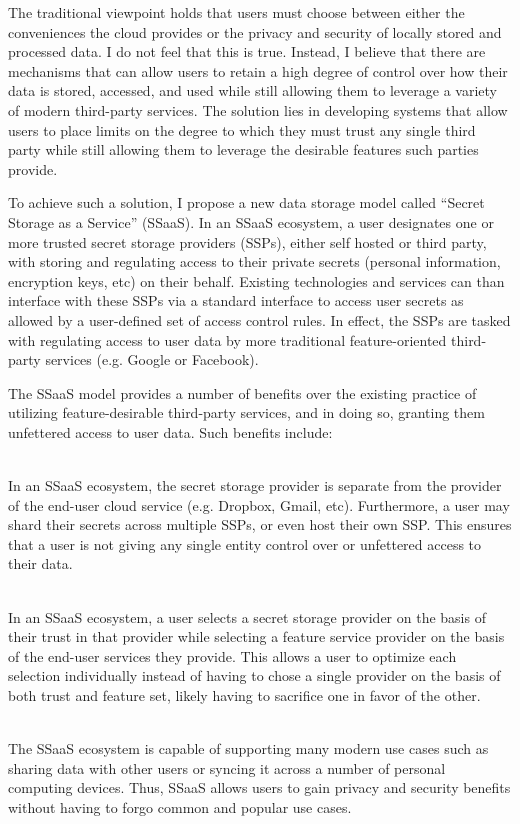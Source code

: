 The traditional viewpoint holds that users must choose between either
the conveniences the cloud provides or the privacy and security of
locally stored and processed data. I do not feel that this is
true. Instead, I believe that there are mechanisms that can allow
users to retain a high degree of control over how their data is
stored, accessed, and used while still allowing them to leverage a
variety of modern third-party services. The solution lies in
developing systems that allow users to place limits on the degree to
which they must trust any single third party while still allowing them
to leverage the desirable features such parties provide.

To achieve such a solution, I propose a new data storage model called
``Secret Storage as a Service'' (SSaaS). In an SSaaS ecosystem, a user
designates one or more trusted secret storage providers (SSPs), either
self hosted or third party, with storing and regulating access to
their private secrets (personal information, encryption keys, etc) on
their behalf. Existing technologies and services can than interface
with these SSPs via a standard interface to access user secrets as
allowed by a user-defined set of access control rules. In effect, the
SSPs are tasked with regulating access to user data by more
traditional feature-oriented third-party services (e.g. Google or
Facebook).

The SSaaS model provides a number of benefits over the existing
practice of utilizing feature-desirable third-party services, and in
doing so, granting them unfettered access to user data. Such benefits
include:

\begin{packed_desc}
\item[No Single Trusted Third Party] \hfill \\ In an SSaaS ecosystem,
  the secret storage provider is separate from the provider of the
  end-user cloud service (e.g. Dropbox, Gmail, etc). Furthermore, a
  user may shard their secrets across multiple SSPs, or even host
  their own SSP. This ensures that a user is not giving any single
  entity control over or unfettered access to their data.
\item[Separation of Duties] \hfill \\ In an SSaaS ecosystem, a user
  selects a secret storage provider on the basis of their trust in
  that provider while selecting a feature service provider on the
  basis of the end-user services they provide. This allows a user to
  optimize each selection individually instead of having to chose a
  single provider on the basis of both trust and feature set, likely
  having to sacrifice one in favor of the other.
\item[Support for Existing Use Cases] \hfill \\ The SSaaS ecosystem is
  capable of supporting many modern use cases such as sharing data
  with other users or syncing it across a number of personal computing
  devices. Thus, SSaaS allows users to gain privacy and security
  benefits without having to forgo common and popular use cases.
\end{packed_desc}

